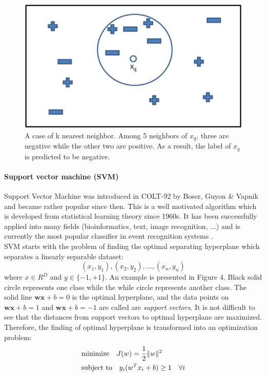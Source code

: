   \begin{figure}[!ht]
  \centering
    \includegraphics[scale=0.5]{./knn.jpg}
  \caption{A case of k nearest neighbor. Among 5 neighbors of $x_{q}$, three are negative while the other two are positive. As a result, the label of $x_{q}$ is predicted to be negative.}
  \end{figure}

  \paragraph{Support vector machine (SVM)}
  Support Vector Machine was introduced in COLT-92 by Boser, Guyon \& Vapnik \cite{boser1992training} and became rather popular since then. This is a well motivated algorithm which is developed from statistical learning theory since 1960s. It has been successfully applied into many fields (bioinformatics, text, image recognition, ...) and is currently the most popular classifier in event recognition systems \cite{jiang2012high}. \\

  \noindent SVM starts with the problem of finding the optimal separating hyperplane which separates a linearly separable dataset: $${(x_{1}, y_{1}), (x_{2}, y_{2}), ..., (x_{n}, y_{n})}$$ where $x \in R^{D}$ and $y \in  \{ -1, +1 \}$. An example is presented in Figure 4. Black solid circle represents one class while the while circle represents another class. The solid line $\mathbf{w} \mathbf{x} + b = 0$ is the optimal hyperplane, and the data points on $\mathbf{w} \mathbf{x} + b = 1$ and $\mathbf{w} \mathbf{x} + b = -1$ are called are {\em support vectors}. It is not difficult to see that the distances from support vectors to optimal hyperplane  are maximized. Therefore, the finding of optimal hyperplane is transformed into an optimization problem:
  \begin{eqnarray}
  & \text{minimize} \quad J(w) = \frac{1}{2} \lVert w \rVert^2 \nonumber \\
  & \text{subject to} \quad y_i (w^{T} x_i + b) \ge 1 \quad \forall i
  \end{eqnarray}
  
